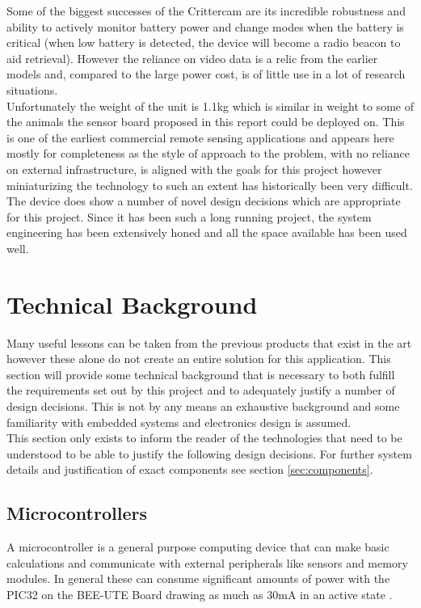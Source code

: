 \documentclass[12pt,openany,a4paper]{book}
\begin{document}
			 Some of the biggest successes of the Crittercam are its incredible robustness and ability to actively monitor battery power and change modes when the battery is critical (when low battery is detected, the device will become a radio beacon to aid retrieval). However the reliance on video data is a relic from the earlier models and, compared to the large power cost, is of little use in a lot of research situations.\\
			 
			  Unfortunately the weight of the unit is 1.1kg which is similar in weight to some of the animals the sensor board proposed in this report could be deployed on. This is one of the earliest commercial remote sensing applications and appears here mostly for completeness as the style of approach to the problem, with no reliance on external infrastructure, is aligned with the goals for this project however miniaturizing the technology to such an extent has historically been very difficult.\\
			  
			  The device does show a number of novel design decisions which are appropriate for this project. Since it has been such a long running project, the system engineering has been extensively honed and all the space available has been used well. 
	\newpage
	\section{Technical Background}
		Many useful lessons can be taken from the previous products that exist in the art however these alone do not create an entire solution for this application. This section will provide some technical background that is necessary to both fulfill the requirements set out by this project and to adequately justify a number of design decisions. This is not by any means an exhaustive background and some familiarity with embedded systems and electronics design is assumed. \\
		
		 This section only exists to inform the reader of the technologies that need to be understood to be able to justify the following design decisions. For further system details and justification of exact components see section \ref{sec:components}. 
		\subsection{Microcontrollers}
		A microcontroller is a general purpose computing device that can make basic calculations and communicate with external peripherals like sensors and memory modules. In general these can consume significant amounts of power with the PIC32 on the BEE-UTE Board \cite{Freakley13} drawing as much as 30mA in an active state \cite{PIC32}. \\
		
\end{document}
